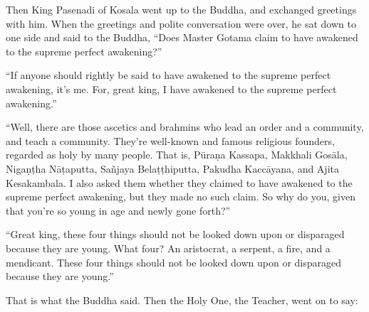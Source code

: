 \documentclass[12pt,openany]{book}%
\begin{document}
Then King Pasenadi of Kosala went up to the Buddha, and exchanged greetings with him. When the greetings and polite conversation were over, he sat down to one side and said to the Buddha, “Does Master Gotama claim to have awakened to the supreme perfect awakening?” 

“If anyone should rightly be said to have awakened to the supreme perfect awakening, it’s me. For, great king, I have awakened to the supreme perfect awakening.” 

“Well, there are those ascetics and brahmins who lead an order and a community, and teach a community. They’re well-known and famous religious founders, regarded as holy by many people. That is, \textsanskrit{Pūraṇa} Kassapa, Makkhali \textsanskrit{Gosāla}, \textsanskrit{Nigaṇṭha} \textsanskrit{Nāṭaputta}, \textsanskrit{Sañjaya} \textsanskrit{Belaṭṭhiputta}, Pakudha \textsanskrit{Kaccāyana}, and Ajita Kesakambala. I also asked them whether they claimed to have awakened to the supreme perfect awakening, but they made no such claim. So why do you, given that you’re so young in age and newly gone forth?” 

“Great king, these four things should not be looked down upon or disparaged because they are young. What four? An aristocrat, a serpent, a fire, and a mendicant. These four things should not be looked down upon or disparaged because they are young.” 

That is what the Buddha said. Then the Holy One, the Teacher, went on to say: 
\end{document}
